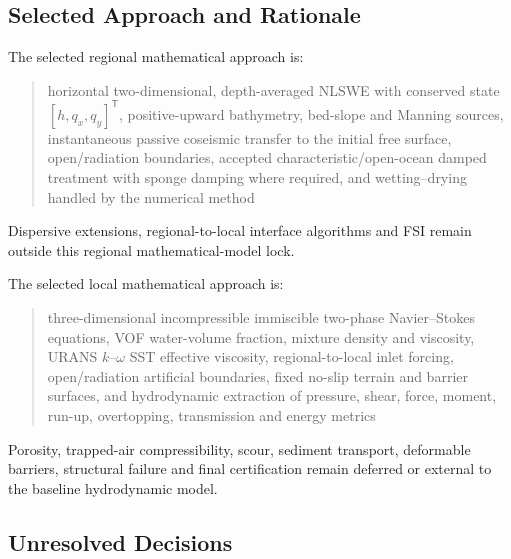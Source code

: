 \subsection{Selected Approach and Rationale}
\label{sec:res-mod-spec-selected-approach}


The selected regional mathematical approach is:

\begin{quote}
  horizontal two-dimensional, depth-averaged NLSWE with conserved state
  $[h,q_x,q_y]^{\mathsf{T}}$, positive-upward bathymetry, bed-slope and
  Manning sources, instantaneous passive coseismic transfer to the
  initial free surface, open/radiation boundaries, accepted
  characteristic/open-ocean damped treatment with sponge damping where
  required, and wetting--drying handled by the numerical method
\end{quote}

Dispersive extensions, regional-to-local interface algorithms and FSI
remain outside this regional mathematical-model lock.

The selected local mathematical approach is:

\begin{quote}
  three-dimensional incompressible immiscible two-phase
  Navier--Stokes equations, VOF water-volume fraction, mixture
  density and viscosity, URANS $k$--$\omega$ SST effective viscosity,
  regional-to-local inlet forcing, open/radiation artificial
  boundaries, fixed no-slip terrain and barrier surfaces, and
  hydrodynamic extraction of pressure, shear, force, moment, run-up,
  overtopping, transmission and energy metrics
\end{quote}

Porosity, trapped-air compressibility, scour, sediment transport,
deformable barriers, structural failure and final certification remain
deferred or external to the baseline hydrodynamic model.

\subsection{Unresolved Decisions}
\label{sec:res-mod-spec-unresolved-decisions}


